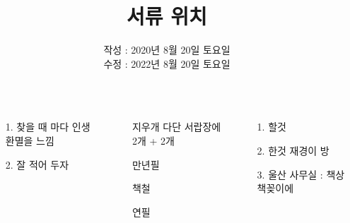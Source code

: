 \documentclass[20pt, a1paper ]{tikzposter}
\title{ 서류 위치 }
\author{ 	작성 : 2020년 8월 20일 토요일 \\
			수정 : 2022년 8월 20일 토요일 }
\begin{document}
	\maketitle

	\begin{columns}


			{
				\begin{large}
					\begin{itemize}
					\item [1.] 찾을 때 마다 인생 환멸을 느낌
					\item [2.]  잘 적어 두자
					\end{itemize}
				\end{large}
			}


		{
			\setlength{\leftmargini}{7em}			
			\setlength{\labelsep}{1em} %

			\begin{large}
			\begin{itemize}
			\item [지우개] 다단 서랍장에 2개 + 2개 
			\item [만년필]
			\item [책철] 
			\item [연필] 


			\end{itemize}
			\end{large}

		}

		{
			\setlength{\leftmargini}{5em}			
			\setlength{\labelsep}{1em} %
			\begin{large}
			\begin{itemize}
			\item [1.] 할것 
			\item [2.] 한것 재경이 방
			\item [3.] 울산 사무실 : 책상 책꽂이에 
			\end{itemize}
			\end{large}

}
\end{columns}
\end{document}
